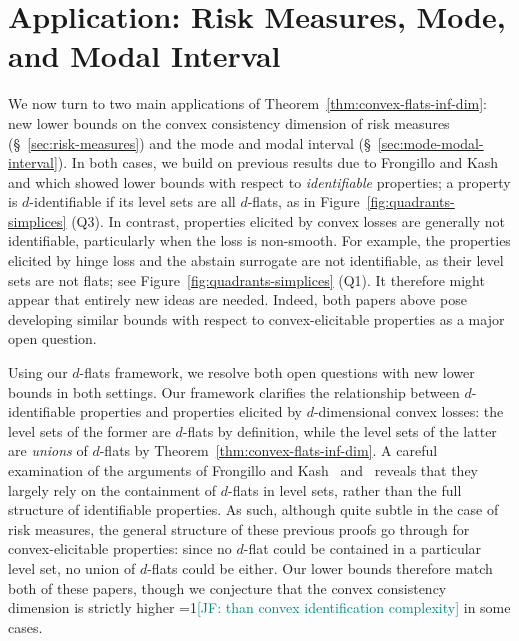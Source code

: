 \documentclass[11pt]{article} %
\newcommand{\Comments}{1}
\newcommand{\mynote}[2]{\ifnum\Comments=1\textcolor{#1}{#2}\fi}
\newcommand{\jessie}[1]{\mynote{teal}{[JF: #1]}}
\begin{document}
\section{Application: Risk Measures, Mode, and Modal Interval}\label{sec:contin-consis}

We now turn to two main applications of Theorem~\ref{thm:convex-flats-inf-dim}: new lower bounds on the convex consistency dimension of risk measures (\S~\ref{sec:risk-measures}) and the mode and modal interval (\S~\ref{sec:mode-modal-interval}).
In both cases, we build on previous results due to Frongillo and Kash~\citep{frongillo2020elicitation,frongillo2015elicitation} and \citet{dearborn2020indirect} which showed lower bounds with respect to \emph{identifiable} properties;
a property is $d$-identifiable if its level sets are all $d$-flats, as in Figure~\ref{fig:quadrants-simplices} (Q3).
In contrast, properties elicited by convex losses are generally not identifiable, particularly when the loss is non-smooth.
For example, the properties elicited by hinge loss and the abstain surrogate are not identifiable, as their level sets are not flats; see Figure~\ref{fig:quadrants-simplices} (Q1).
It therefore might appear that entirely new ideas are needed.
Indeed, both papers above pose developing similar bounds with respect to convex-elicitable properties as a major open question.

Using our $d$-flats framework, we resolve both open questions with new lower bounds in both settings.
Our framework clarifies the relationship between $d$-identifiable properties and properties elicited by $d$-dimensional convex losses: the level sets of the former are $d$-flats by definition, while the level sets of the latter are \emph{unions} of $d$-flats by Theorem~\ref{thm:convex-flats-inf-dim}.
A careful examination of the arguments of Frongillo and Kash~\citep{frongillo2020elicitation,frongillo2015elicitation} and~\citet{dearborn2020indirect} reveals that they largely rely on the containment of $d$-flats in level sets, rather than the full structure of identifiable properties.
As such, although quite subtle in the case of risk measures, the general structure of these previous proofs go through for convex-elicitable properties: since no $d$-flat could be contained in a particular level set, no union of $d$-flats could be either.
Our lower bounds therefore match both of these papers, though we conjecture that the convex consistency dimension is strictly higher \jessie{than convex identification complexity} in some cases.
\end{document}
